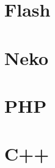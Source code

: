 \section{Flash}
\label{target-flash}

\section{Neko}
\label{target-neko}

\section{PHP}
\label{target-php}

\section{C++}
\label{target-cpp}

